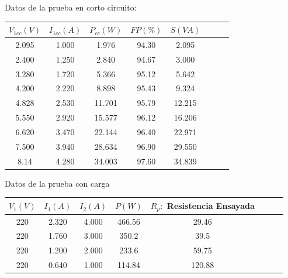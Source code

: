 \documentclass[12pt]{article}
\begin{document}
\begin{enumerate}
    Datos de la prueba en corto circuito:
    \begin{center}
        \begin{tabular}{ |c|c|c|c|c|c|c|c| } 
            \hline
            $V_{1cc}(V)$ & $I_{1cc}(A)$ & $P_{cc}(W)$ & $FP(\%)$ & $S(VA)$ \\
            \hline
            2.095 & 1.000 & 1.976 & 94.30 & 2.095 \\ 
            2.400 & 1.250 & 2.840 & 94.67 & 3.000 \\ 
            3.280 & 1.720 & 5.366 & 95.12 & 5.642 \\ 
            4.200 & 2.220 & 8.898 & 95.43 & 9.324 \\ 
            4.828 & 2.530 & 11.701 & 95.79 & 12.215 \\ 
            5.550 & 2.920 & 15.577 & 96.12 & 16.206 \\ 
            6.620 & 3.470 & 22.144 & 96.40 & 22.971 \\ 
            7.500 & 3.940 & 28.634 & 96.90 & 29.550 \\ 
            8.14 & 4.280 & 34.003 & 97.60 & 34.839 \\ 
            \hline
        \end{tabular}
    \end{center}
    
    Datos de la prueba con carga
    \begin{center}
        \begin{tabular}{ |c|c|c|c|c|c|c|c| } 
            \hline
            $V_{1}(V)$ & $I_{1}(A)$ & $I_{2}(A)$ & $P(W)$ & $R_{p}:$ Resistencia Ensayada \\
            \hline
            220 & 2.320 & 4.000 & 466.56 & 29.46 \\ 
            220 & 1.760 & 3.000 & 350.2 & 39.5 \\ 
            220 & 1.200 & 2.000 & 233.6 & 59.75 \\ 
            220 & 0.640 & 1.000 & 114.84 & 120.88 \\ 
            \hline
        \end{tabular}
    \end{center}
    

\end{enumerate}
\end{document}
